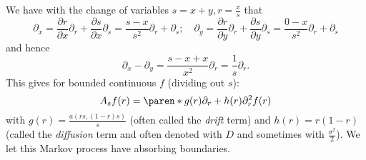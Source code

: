 \documentclass{article}
\begin{document}
We have with the change of variables $s = x+y, r = \frac{x}{s}$ that
\[
\partial_x
= \frac{\partial r}{\partial x}\partial_r + \frac{\partial s}{\partial x}\partial_s
= \frac{s - x}{s^2}\partial_r + \partial_s;
\quad \partial_y
= \frac{\partial r}{\partial y}\partial_r + \frac{\partial s}{\partial y}\partial_s
= \frac{0 - x}{s^2}\partial_r + \partial_s
\]
and hence
\[
\partial_x - \partial_y
= \frac{s - x + x}{x^2}\partial_r
= \frac{1}{s}\partial_r.
\]
This gives for bounded continuous $f$ (dividing out $s$):
\[
A_s f(r)
= \paren*{g(r) \partial_r + h(r) \partial_r^2} f(r)
\]
with $g(r) = \frac{a(rs, (1-r)s)}{s}$ (often called the \emph{drift} term) and $h(r)=r(1-r)$ (called the \emph{diffusion} term and often denoted with $D$ and sometimes with $\frac{\sigma^2}{2}$). We let this Markov process have absorbing boundaries.

\end{document}
